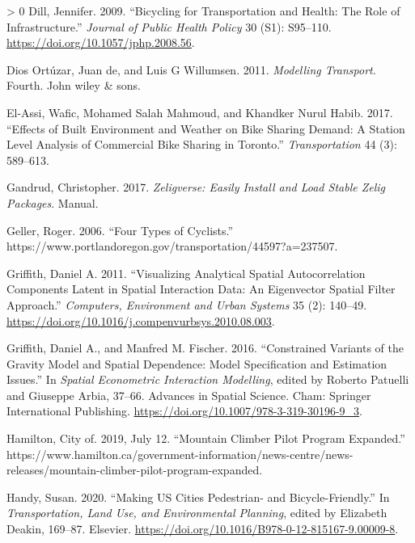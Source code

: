 \documentclass[smallextended]{svjour3}       %
\newlength{\cslhangindent}
\newenvironment{CSLReferences}[3] %
 {%
  \setlength{\parindent}{0pt}
  \ifodd #1 \everypar{\setlength{\hangindent}{\cslhangindent}}\ignorespaces\fi
  \ifnum #2 > 0
  \setlength{\parskip}{#2\baselineskip}
  \fi
 }%
 {}
\begin{document}
\begin{CSLReferences}{1}{0}
\leavevmode\hypertarget{ref-Dill2009}{}%
Dill, Jennifer. 2009. {``Bicycling for Transportation and Health: {The}
Role of Infrastructure.''} \emph{Journal of Public Health Policy} 30
(S1): S95--110. \url{https://doi.org/10.1057/jphp.2008.56}.

\leavevmode\hypertarget{ref-deDios2011Modelling}{}%
Dios Ortúzar, Juan de, and Luis G Willumsen. 2011. \emph{Modelling
Transport}. Fourth. {John wiley \& sons}.

\leavevmode\hypertarget{ref-elAssi2017effects}{}%
El-Assi, Wafic, Mohamed Salah Mahmoud, and Khandker Nurul Habib. 2017.
{``Effects of Built Environment and Weather on Bike Sharing Demand: A
Station Level Analysis of Commercial Bike Sharing in {Toronto}.''}
\emph{Transportation} 44 (3): 589--613.

\leavevmode\hypertarget{ref-Gandrud2017}{}%
Gandrud, Christopher. 2017. \emph{Zeligverse: {Easily} Install and Load
Stable Zelig Packages}. Manual.

\leavevmode\hypertarget{ref-Geller2006}{}%
Geller, Roger. 2006. {``Four Types of Cyclists.''}
https://www.portlandoregon.gov/transportation/44597?a=237507.

\leavevmode\hypertarget{ref-Griffith2011}{}%
Griffith, Daniel A. 2011. {``Visualizing Analytical Spatial
Autocorrelation Components Latent in Spatial Interaction Data: {An}
Eigenvector Spatial Filter Approach.''} \emph{Computers, Environment and
Urban Systems} 35 (2): 140--49.
\url{https://doi.org/10.1016/j.compenvurbsys.2010.08.003}.

\leavevmode\hypertarget{ref-griffithConstrainedVariantsGravity2016}{}%
Griffith, Daniel A., and Manfred M. Fischer. 2016. {``Constrained
{Variants} of the {Gravity Model} and {Spatial Dependence}: {Model
Specification} and {Estimation Issues}.''} In \emph{Spatial {Econometric
Interaction Modelling}}, edited by Roberto Patuelli and Giuseppe Arbia,
37--66. Advances in {Spatial Science}. {Cham}: {Springer International
Publishing}. \url{https://doi.org/10.1007/978-3-319-30196-9_3}.

\leavevmode\hypertarget{ref-Hamilton2019}{}%
Hamilton, City of. 2019, July 12. {``Mountain Climber Pilot Program
Expanded.''}
https://www.hamilton.ca/government-information/news-centre/news-releases/mountain-climber-pilot-program-expanded.

\leavevmode\hypertarget{ref-handyMakingUSCities2020}{}%
Handy, Susan. 2020. {``Making {US} Cities Pedestrian- and
Bicycle-Friendly.''} In \emph{Transportation, {Land Use}, and
{Environmental Planning}}, edited by Elizabeth Deakin, 169--87.
{Elsevier}. \url{https://doi.org/10.1016/B978-0-12-815167-9.00009-8}.


\end{CSLReferences}
\end{document}
